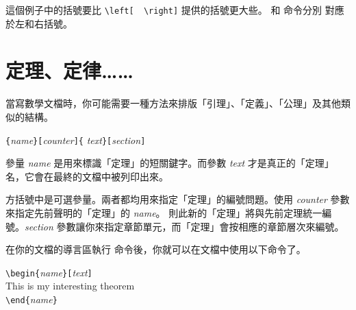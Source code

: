 \noindent 這個例子中的括號要比 \verb|\left[  \right]| 提供的括號更大些。 和  命令分別
對應於左和右括號。

\section{定理、定律……}
當寫數學文檔時，你可能需要一種方法來排版「引理」、「定義」、「公理」及其他類似的結構。
\begin{lscommand}
\verb|{|\emph{name}\verb|}[|\emph{counter}\verb|]{|%
         \emph{text}\verb|}[|\emph{section}\verb|]|
\end{lscommand}
%
%

參量 \emph{name} 是用來標識「定理」的短關鍵字。而參數 \emph{text} 才是真正的「定理」名，它會在最終的文檔中被列印出來。

方括號中是可選參量。兩者都均用來指定「定理」的編號問題。使用 \emph{counter} 參數來指定先前聲明的「定理」的 \emph{name}。
則此新的「定理」將與先前定理統一編號。\emph{section} 參數讓你來指定章節單元，而「定理」會按相應的章節層次來編號。

在你的文檔的導言區執行  命令後，你就可以在文檔中使用以下命令了。


\begin{code}
\verb|\begin{|\emph{name}\verb|}[|\emph{text}\verb|]|\\
This is my interesting theorem\\
\verb|\end{|\emph{name}\verb|}|
\end{code}

